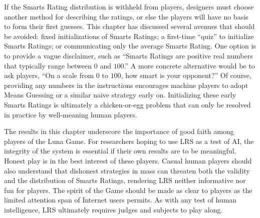 If the Smarts Rating distribution is withheld from players, designers must choose another method for describing the ratings, or else the players will have no basis to form their first guesses. This chapter has discussed several avenues that should be avoided: fixed initializations of Smarts Ratings; a first-time ``quiz'' to initialize Smarts Ratings; or communicating only the average Smarts Rating. One option is to provide a vague disclaimer, such as ``Smarts Ratings are positive real numbers that typically range between $0$ and $100$.'' A more concrete alternative would be to ask players, ``On a scale from $0$ to $100$, how smart is your opponent?'' Of course, providing any numbers in the instructions encourages machine players to adopt Means Guessing or a similar naive strategy early on. Initializing these early Smarts Ratings is ultimately a chicken-or-egg problem that can only be resolved in practice by well-meaning human players.

The results in this chapter underscore the importance of good faith among players of the Luna Game. For researchers hoping to use LRS as a test of AI, the integrity of the system is essential if their own results are to be meaningful. Honest play is in the best interest of these players. Casual human players should also understand that dishonest strategies in mass can threaten both the validity and the distribution of Smarts Ratings, rendering LRS neither informative nor fun for players. The spirit of the Game should be made as clear to players as the limited attention span of Internet users permits. As with any test of human intelligence, LRS ultimately requires judges and subjects to play along.
